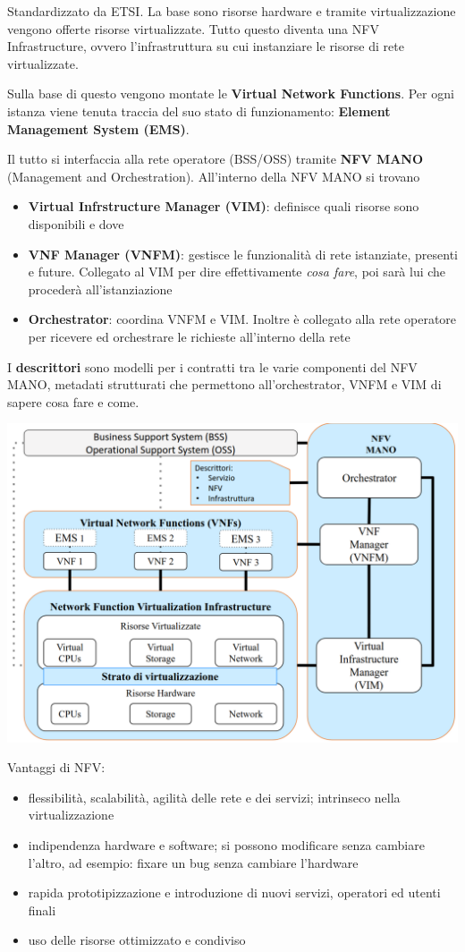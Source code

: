 Standardizzato da ETSI. La base sono risorse hardware e tramite virtualizzazione vengono offerte risorse virtualizzate. Tutto questo diventa una NFV Infrastructure, ovvero l'infrastruttura su cui instanziare le risorse di rete virtualizzate.

Sulla base di questo vengono montate le \textbf{Virtual Network Functions}. Per ogni istanza viene tenuta traccia del suo stato di funzionamento: \textbf{Element Management System (EMS)}.

Il tutto si interfaccia alla rete operatore (BSS/OSS) tramite \textbf{NFV MANO} (Management and Orchestration). All'interno della NFV MANO si trovano
\begin{itemize}
	\item \textbf{Virtual Infrstructure Manager (VIM)}: definisce quali risorse sono disponibili e dove
	\item \textbf{VNF Manager (VNFM)}: gestisce le funzionalità di rete istanziate, presenti e future. Collegato al VIM per dire effettivamente \textit{cosa fare}, poi sarà lui che procederà all'istanziazione
	\item \textbf{Orchestrator}: coordina VNFM e VIM. Inoltre è collegato alla rete operatore per ricevere ed orchestrare le richieste all'interno della rete
\end{itemize}

I \textbf{descrittori} sono modelli per i contratti tra le varie componenti del NFV MANO, metadati strutturati che permettono all'orchestrator, VNFM e VIM di sapere cosa fare e come.

\begin{center}
	\includegraphics[width=0.8\linewidth]{img/5g/nfv1}
\end{center}

Vantaggi di NFV: 
\begin{itemize}
	\item flessibilità, scalabilità, agilità delle rete e dei servizi; intrinseco nella virtualizzazione
	\item indipendenza hardware e software; si possono modificare senza cambiare l'altro, ad esempio: fixare un bug senza cambiare l'hardware
	\item rapida prototipizzazione e introduzione di nuovi servizi, operatori ed utenti finali
	\item uso delle risorse ottimizzato e condiviso
\end{itemize}

